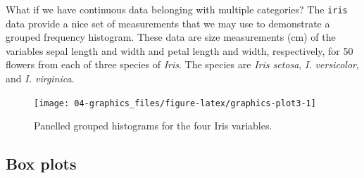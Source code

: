 \documentclass[english,10pt,a4paper,oneside]{book}
\newenvironment{Shaded}{\begin{snugshade}}{\end{snugshade}}
\newcommand{\KeywordTok}[1]{\textcolor[rgb]{0.13,0.29,0.53}{\textbf{#1}}}
\newcommand{\DataTypeTok}[1]{\textcolor[rgb]{0.13,0.29,0.53}{#1}}
\newcommand{\DecValTok}[1]{\textcolor[rgb]{0.00,0.00,0.81}{#1}}
\newcommand{\StringTok}[1]{\textcolor[rgb]{0.31,0.60,0.02}{#1}}
\newcommand{\CommentTok}[1]{\textcolor[rgb]{0.56,0.35,0.01}{\textit{#1}}}
\newcommand{\OtherTok}[1]{\textcolor[rgb]{0.56,0.35,0.01}{#1}}
\newcommand{\OperatorTok}[1]{\textcolor[rgb]{0.81,0.36,0.00}{\textbf{#1}}}
\newcommand{\NormalTok}[1]{#1}
\theoremstyle{definition}
\theoremstyle{definition}
\theoremstyle{definition}
\theoremstyle{remark}
\begin{document}
What if we have continuous data belonging with multiple categories? The
\texttt{iris} data provide a nice set of measurements that we may use to
demonstrate a grouped frequency histogram. These data are size
measurements (cm) of the variables sepal length and width and petal
length and width, respectively, for 50 flowers from each of three
species of \emph{Iris}. The species are \emph{Iris setosa}, \emph{I.
versicolor}, and \emph{I. virginica}.

\begin{Shaded}
\end{Shaded}

\begin{figure}
\texttt{[image: 04-graphics\_files/figure-latex/graphics-plot3-1]} \caption{Panelled grouped histograms for the four Iris variables.}\label{fig:graphics-plot3}
\end{figure}

\subsection{Box plots}\label{box-plots}
\end{document}

